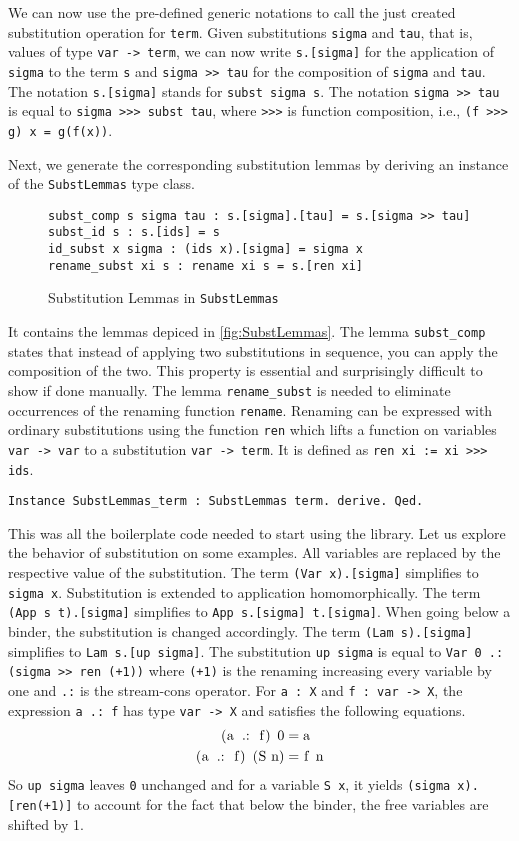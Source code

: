 \documentclass{scrartcl}
\newcommand{\lst}{\lstinline}
\begin{document}
We can now use the pre-defined generic notations to call the just created substitution operation for \lst$term$. Given substitutions \lst$sigma$ and \lst$tau$, that is, values of type \lst$var -> term$, we can now write \lst$s.[sigma]$ for the application of \lst$sigma$ to  the term \lst$s$ and \lst$sigma >> tau$ for the composition of \lst$sigma$ and \lst$tau$. 
The notation \lst$s.[sigma]$ stands for \lst$subst sigma s$. 
The notation \lst$sigma >> tau$ is equal to \lst$sigma >>> subst tau$, where \lst$>>>$ is function composition, i.e., \lst$(f >>> g) x = g(f(x))$.

Next, we generate the corresponding substitution lemmas by deriving an instance of the \lst$SubstLemmas$ type class.
\begin{figure}
\begin{lstlisting}
subst_comp s sigma tau : s.[sigma].[tau] = s.[sigma >> tau]
subst_id s : s.[ids] = s
id_subst x sigma : (ids x).[sigma] = sigma x
rename_subst xi s : rename xi s = s.[ren xi]
\end{lstlisting}
  \caption{Substitution Lemmas in \lst$SubstLemmas$}
  \label{fig:SubstLemmas}
\end{figure}
It contains the lemmas depiced in \autoref{fig:SubstLemmas}.
The lemma \lst$subst_comp$ states that instead of applying two substitutions in sequence, you can apply the composition of the two. This property is essential and surprisingly difficult to show if done manually. 
The lemma \lst$rename_subst$ is needed to eliminate occurrences of the renaming function \lst$rename$. Renaming can be expressed with ordinary substitutions using the function \lst$ren$ which lifts a function on variables \lst$var -> var$ to a substitution \lst$var -> term$. It is defined as \lst$ren xi := xi >>> ids$.
\begin{lstlisting}
Instance SubstLemmas_term : SubstLemmas term. derive. Qed.
\end{lstlisting}


This was all the boilerplate code needed to start using the library.
Let us explore the behavior of substitution on some examples.
All variables are replaced by the respective value of the substitution. The term \lst$(Var x).[sigma]$ simplifies to \lst$sigma x$.
Substitution is extended to application homomorphically. 
The term \lst$(App s t).[sigma]$ simplifies to \lst$App s.[sigma] t.[sigma]$.
When going below a binder, the substitution is changed accordingly. 
The term \lst$(Lam s).[sigma]$ simplifies to \lst$Lam s.[up sigma]$. 
The substitution \lst$up sigma$ is equal to \lst$Var 0 .: (sigma >> ren (+1))$ where \lst$(+1)$ is the renaming increasing every variable by one and \lst$.:$ is the stream-cons operator.
For \lst$a : X$ and \lst$f : var -> X$, the expression \lst$a .: f$ has type \lst$var -> X$ and satisfies the following equations.
\begin{align*}
  \text{\lst$(a .: f) 0$} &= \text{\lst$a$} \\
  \text{\lst$(a .: f) (S n)$} &= \text{\lst$f n$}
\end{align*}
So \lst$up sigma$ leaves \lst$0$ unchanged and for a variable \lst$S x$, it yields \lst$(sigma x).[ren(+1)]$ to account for the fact that below the binder, the free variables are shifted by 1.
\end{document}

